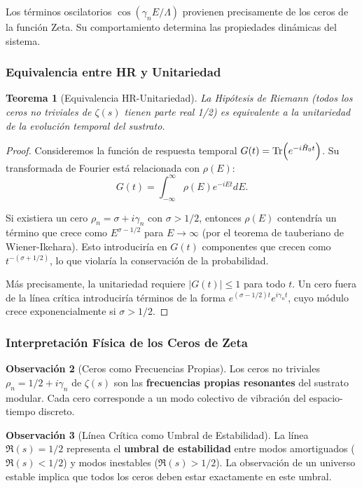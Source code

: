 \documentclass[11pt, a4paper]{article}
\theoremstyle{plain}
\newtheorem{teorema}{Teorema}[section]
\theoremstyle{definition}
\newtheorem{observacion}[teorema]{Observación}
\begin{document}
Los términos oscilatorios $\cos(\gamma_n E/\Lambda)$ provienen precisamente de los ceros de la función Zeta. Su comportamiento determina las propiedades dinámicas del sistema.

\subsubsection{Equivalencia entre HR y Unitariedad}

\begin{teorema}[Equivalencia HR-Unitariedad]
La Hipótesis de Riemann (todos los ceros no triviales de $\zeta(s)$ tienen parte real 1/2) es equivalente a la unitariedad de la evolución temporal del sustrato.
\end{teorema}

\begin{proof}
Consideremos la función de respuesta temporal $G(t) = \Tr(e^{-i\hat{H}_0 t})$. Su transformada de Fourier está relacionada con $\rho(E)$:
\begin{equation}
G(t) = \int_{-\infty}^\infty \rho(E) e^{-iEt} dE.
\end{equation}

Si existiera un cero $\rho_n = \sigma + i\gamma_n$ con $\sigma > 1/2$, entonces $\rho(E)$ contendría un término que crece como $E^{\sigma-1/2}$ para $E \to \infty$ (por el teorema de tauberiano de Wiener-Ikehara). Esto introduciría en $G(t)$ componentes que crecen como $t^{-(\sigma+1/2)}$, lo que violaría la conservación de la probabilidad.

Más precisamente, la unitariedad requiere $|G(t)| \leq 1$ para todo $t$. Un cero fuera de la línea crítica introduciría términos de la forma $e^{(\sigma-1/2)t} e^{i\gamma_n t}$, cuyo módulo crece exponencialmente si $\sigma > 1/2$.
\end{proof}

\subsubsection{Interpretación Física de los Ceros de Zeta}

\begin{observacion}[Ceros como Frecuencias Propias]
Los ceros no triviales $\rho_n = 1/2 + i\gamma_n$ de $\zeta(s)$ son las \textbf{frecuencias propias resonantes} del sustrato modular. Cada cero corresponde a un modo colectivo de vibración del espacio-tiempo discreto.
\end{observacion}

\begin{observacion}[Línea Crítica como Umbral de Estabilidad]
La línea $\Re(s) = 1/2$ representa el \textbf{umbral de estabilidad} entre modos amortiguados ($\Re(s) < 1/2$) y modos inestables ($\Re(s) > 1/2$). La observación de un universo estable implica que todos los ceros deben estar exactamente en este umbral.
\end{observacion}
\end{document}
